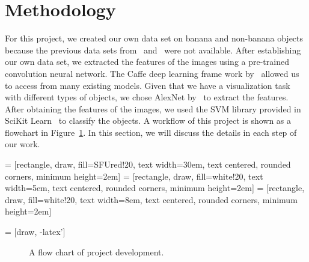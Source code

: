 \documentclass{article} %
\begin{document}
\section{Methodology}
\label{sec:method}
For this project, we created our own data set on banana and non-banana objects because the previous data sets from~\citet{saad2009recognizing} and~\citet{paulraj2009color} were not available. After establishing our own data set, we extracted the features of the images using a pre-trained convolution neural network. The Caffe deep learning frame work by~\citet{jia2014caffe} allowed us to access from many existing models. Given that we have a visualization task with different types of objects, we chose AlexNet by~\citet{krizhevsky2012imagenet} to extract the features. After obtaining the features of the images, we used the SVM library provided in SciKit Learn~\citep{scikit-learn} to classify the objects. A workflow of this project is shown as a flowchart in Figure~\ref{fig:flowchart}. In this section, we will discuss the details in each step of our work. 

 = [rectangle, draw, fill=SFUred!20, 
    text width=30em, text centered, rounded corners, minimum height=2em]
     = [rectangle, draw, fill=white!20, 
    text width=5em, text centered, rounded corners, minimum height=2em]
         = [rectangle, draw, fill=white!20, 
    text width=8em, text centered, rounded corners, minimum height=2em]

 = [draw, -latex']

\begin{figure} [h]
\centering 
{
}
\caption{A flow chart of project development.}
\label{fig:flowchart}
 \end{figure}
\end{document}
